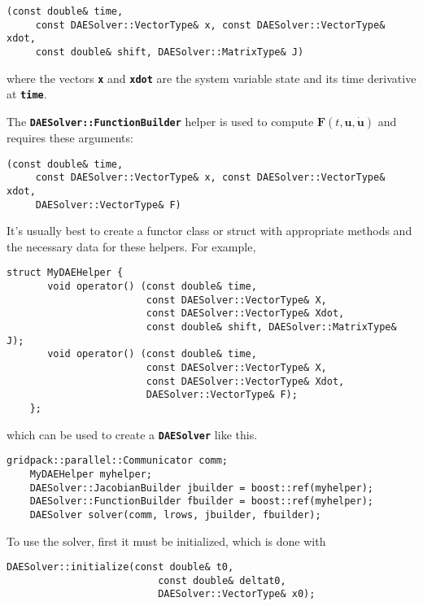 {
\color{red}
\begin{Verbatim}[fontseries=b]
    (const double& time, 
     const DAESolver::VectorType& x, const DAESolver::VectorType& xdot, 
     const double& shift, DAESolver::MatrixType& J)
\end{Verbatim}
}

where the vectors \textbf{\texttt{x}} and \textbf{\texttt{xdot}} are
the system variable state and its time derivative at
\textbf{\texttt{time}}.

The \texttt{\textbf{DAESolver::FunctionBuilder}} helper is
used to compute $ \mathbf{F} \left( t, \mathbf{u},  \mathbf{\dot{u}}
  \right)$ and requires these arguments: 

{
\color{red}
\begin{Verbatim}[fontseries=b]
    (const double& time, 
     const DAESolver::VectorType& x, const DAESolver::VectorType& xdot, 
     DAESolver::VectorType& F)
\end{Verbatim}
}

It's usually best to create a functor class or struct with appropriate
methods and the necessary data for these helpers. For example,

{
\color{red}
\begin{Verbatim}[fontseries=b]
    struct MyDAEHelper {
       void operator() (const double& time, 
                        const DAESolver::VectorType& X, 
                        const DAESolver::VectorType& Xdot, 
                        const double& shift, DAESolver::MatrixType& J);
       void operator() (const double& time, 
                        const DAESolver::VectorType& X, 
                        const DAESolver::VectorType& Xdot, 
                        DAESolver::VectorType& F);
    };
\end{Verbatim}
}

which can be used to create a \texttt{\textbf{DAESolver}} like this.  

{
\color{red}
\begin{Verbatim}[fontseries=b]
    gridpack::parallel::Communicator comm;
    MyDAEHelper myhelper;
    DAESolver::JacobianBuilder jbuilder = boost::ref(myhelper);
    DAESolver::FunctionBuilder fbuilder = boost::ref(myhelper);
    DAESolver solver(comm, lrows, jbuilder, fbuilder);
\end{Verbatim}
}

To use the solver, first it must be initialized, which is done with

{
\color{red}
\begin{Verbatim}[fontseries=b]
    DAESolver::initialize(const double& t0,
                          const double& deltat0,
                          DAESolver::VectorType& x0);
\end{Verbatim}
}

